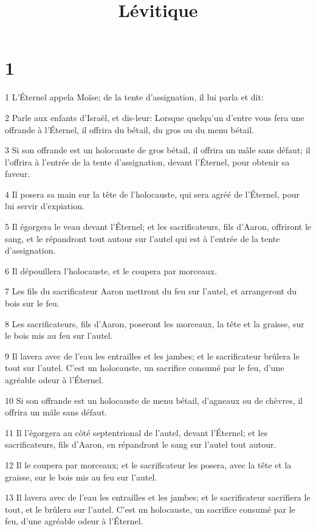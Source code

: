 

\title{Lévitique}


\chapter{1}

\par 1 L'Éternel appela Moïse; de la tente d'assignation, il lui parla et dit:
\par 2 Parle aux enfants d'Israël, et dis-leur: Lorsque quelqu'un d'entre vous fera une offrande à l'Éternel, il offrira du bétail, du gros ou du menu bétail.
\par 3 Si son offrande est un holocauste de gros bétail, il offrira un mâle sans défaut; il l'offrira à l'entrée de la tente d'assignation, devant l'Éternel, pour obtenir sa faveur.
\par 4 Il posera sa main sur la tête de l'holocauste, qui sera agréé de l'Éternel, pour lui servir d'expiation.
\par 5 Il égorgera le veau devant l'Éternel; et les sacrificateurs, fils d'Aaron, offriront le sang, et le répandront tout autour sur l'autel qui est à l'entrée de la tente d'assignation.
\par 6 Il dépouillera l'holocauste, et le coupera par morceaux.
\par 7 Les fils du sacrificateur Aaron mettront du feu sur l'autel, et arrangeront du bois sur le feu.
\par 8 Les sacrificateurs, fils d'Aaron, poseront les morceaux, la tête et la graisse, sur le bois mis au feu sur l'autel.
\par 9 Il lavera avec de l'eau les entrailles et les jambes; et le sacrificateur brûlera le tout sur l'autel. C'est un holocauste, un sacrifice consumé par le feu, d'une agréable odeur à l'Éternel.
\par 10 Si son offrande est un holocauste de menu bétail, d'agneaux ou de chèvres, il offrira un mâle sans défaut.
\par 11 Il l'égorgera au côté septentrional de l'autel, devant l'Éternel; et les sacrificateurs, fils d'Aaron, en répandront le sang sur l'autel tout autour.
\par 12 Il le coupera par morceaux; et le sacrificateur les posera, avec la tête et la graisse, sur le bois mis au feu sur l'autel.
\par 13 Il lavera avec de l'eau les entrailles et les jambes; et le sacrificateur sacrifiera le tout, et le brûlera sur l'autel. C'est un holocauste, un sacrifice consumé par le feu, d'une agréable odeur à l'Éternel.
